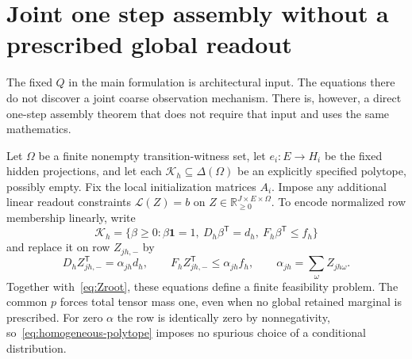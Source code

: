 \documentclass[11pt]{article}
\newcommand{\R}{\mathbb R}
\newcommand{\one}{\mathbf 1}
\newcommand{\Kcal}{\mathcal K}
\theoremstyle{remark}
\begin{document}
\section{Joint one step assembly without a prescribed global readout}\label{sec:umbrella}

The fixed $Q$ in the main formulation is architectural input. The equations there do not discover a joint coarse observation mechanism. There is, however, a direct one-step assembly theorem that does not require that input and uses the same mathematics.

Let $\Omega$ be a finite nonempty transition-witness set, let $e_i:E\to H_i$ be the fixed hidden projections, and let each $\Kcal_h\subseteq\Delta(\Omega)$ be an explicitly specified polytope, possibly empty. Fix the local initialization matrices $A_i$. Impose any additional linear readout constraints $\mathcal L(Z)=b$ on $Z\in\R_{\ge0}^{J\times E\times\Omega}$. To encode normalized row membership linearly, write
\[
 \Kcal_h=\{\beta\ge0:\beta\one=1,\ D_h\beta^{\mathsf T}=d_h,
 \ F_h\beta^{\mathsf T}\le f_h\}
\]
and replace it on row $Z_{jh,-}$ by
\begin{equation}\label{eq:homogeneous-polytope}
 D_hZ_{jh,-}^{\mathsf T}=\alpha_{jh}d_h,
 \qquad F_hZ_{jh,-}^{\mathsf T}\le\alpha_{jh}f_h,
 \qquad\alpha_{jh}=\sum_\omega Z_{jh\omega}.
\end{equation}
Together with~\eqref{eq:Zroot}, these equations define a finite feasibility problem. The common $p$ forces total tensor mass one, even when no global retained marginal is prescribed. For zero $\alpha$ the row is identically zero by nonnegativity, so~\eqref{eq:homogeneous-polytope} imposes no spurious choice of a conditional distribution.
\end{document}
